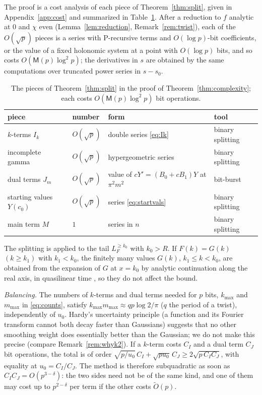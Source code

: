 \documentclass[11pt,reqno]{amsart}
\theoremstyle{definition}
\theoremstyle{remark}
\newcommand{\Mul}{\mathsf{M}}
\begin{document}
The proof is a cost analysis of each piece of Theorem~\ref{thm:split}, given in Appendix~\ref{app:cost} and
summarized in Table~\ref{tab:pieces}. After a reduction to $f$ analytic at $0$ and $\chi$ even
(Lemma~\ref{lem:reduction}, Remark~\ref{rem:twist}), each of the $O(\sqrt p)$ pieces is a series with P-recursive
terms and $O(\log p)$-bit coefficients, or the value of a fixed holonomic system at a point with $O(\log p)$ bits, and
so costs $O(\Mul(p)\log^2p)$; the derivatives in $s$ are obtained by the same computations over truncated power series
in $s - s_0$.

\begin{table}[ht]
\centering\footnotesize
\caption{The pieces of Theorem~\ref{thm:split} in the proof of Theorem~\ref{thm:complexity}; each costs
$O(\Mul(p)\log^2p)$ bit operations.}
\label{tab:pieces}
\begin{tabular}{@{}llll@{}}
\toprule
piece & number & form & tool \\
\midrule
$k$-terms $I_k$ & $O(\sqrt p)$ & double series \eqref{eq:Ik} & binary splitting \\
incomplete gamma & $O(\sqrt p)$ & hypergeometric series & binary splitting \\
dual terms $J_m$ & $O(\sqrt p)$ & value of $cY' = (B_0 + cB_1)Y$ at $\pi^2m^2$ & bit-burst \\
starting values $Y(c_0)$ & $O(\sqrt p)$ & series \eqref{eq:startvals} & binary splitting \\
main term $M$ & $1$ & series in $n$ & binary splitting \\
\bottomrule
\end{tabular}
\end{table}

The splitting is applied to the tail $L_F^{\ge k_0}$ with $k_0 > R$. If $F(k) = G(k)$ $(k \ge k_1)$ with $k_1 < k_0$, the finitely many
values $G(k)$, $k_1 \le k < k_0$, are obtained from the expansion of $G$ at $x = k_0$ by analytic continuation along
the real axis, in quasilinear time \cite{CC90,vdH99}, so they do not affect the bound.

\emph{Balancing.} The numbers of $k$-terms and dual terms needed for $p$ bits, $k_{\max}$ and $m_{\max}$ in
\eqref{eq:counts}, satisfy $k_{\max}m_{\max} \approx qp\log2/\pi$ ($q$ the period of a twist), independently of $u_0$. Hardy's uncertainty principle (a function and its Fourier transform cannot both decay
faster than Gaussians) suggests that no other smoothing weight does essentially better than the Gaussian; we do not
make this precise (compare Remark~\ref{rem:whyk2}). If a $k$-term costs $C_I$ and a dual term $C_J$ bit
operations, the total is of order $\sqrt{p/u_0}\,C_I + \sqrt{pu_0}\,C_J \ge 2\sqrt{p\,C_IC_J}$, with equality at
$u_0 = C_I/C_J$. The method is therefore subquadratic as soon as $C_IC_J = O(p^{3-\delta})$: the two sides need not be of
the same kind, and one of them may cost up to $p^{2-\delta}$ per term if the other costs $\widetilde O(p)$.
\end{document}
